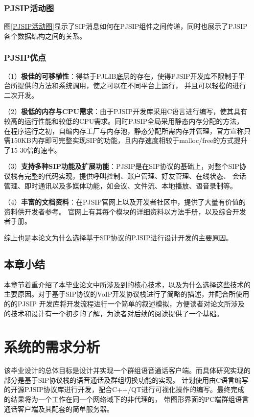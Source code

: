 \documentclass[a4paper,AutoFakeBold,oneside,12pt]{book}
\begin{document}
\subsection{PJSIP活动图}
图\ref{PJSIP活动图}显示了SIP消息如何在PJSIP组件之间传递，同时也展示了PJSIP各个数据结构之间的关系。
\subsection{PJSIP优点}
（1）\textbf{极佳的可移植性}：得益于PJLIB底层的存在，使得PJSIP开发库不限制于平台所提供的方法和系统调用，使之可以在不同平台上运行，
并且可以轻松的进行二次开发。

（2）\textbf{极低的内存与CPU需求}：由于PJSIP开发库采用C语言进行编写，使其具有较高的运行性能和较低的CPU需求。同时PJSIP全局采用静态内存分配的方法，
在程序运行之初，自编内存工厂与内存池，静态分配所需内存并管理，官方宣称只需150KB内存即可完整实现SIP的功能，且内存速度相较于malloc/free的方式提升了15-30倍的速率。

（3）\textbf{支持多种SIP功能及扩展功能}：PJSIP是在SIP协议的基础上，对整个SIP协议栈有完整的代码实现，提供呼叫控制、账户管理、好友管理、在线状态、
会话管理、即时通讯以及多媒体功能，如会议、文件流、本地播放、语音录制等。

（4）\textbf{丰富的文档资料}：在PJSIP官网上以及开发者社区中，提供了大量有价值的资料供开发者参考。
官网上有其每个模块的详细资料以方法手册，以及综合开发者手册。

综上也是本论文为什么选择基于SIP协议的PJSIP进行设计开发的主要原因。
\section{本章小结}
本章节着重介绍了本毕业论文中所涉及到的核心技术，以及为什么选择这些技术的主要原因。对于基于SIP协议的VoIP开发协议栈进行了简略的描述，并配合所使用的的PJSIP
开发库将开发流程进行一个简单的叙述模拟，方便读者对论文所涉及的技术和设计有一个初步的了解，为读者对后续的阅读提供了一个基础。

\newpage
\chapter{系统的需求分析}
该毕业设计的总体目标是设计并实现一个群组语音通话客户端。而具体研究实现的部分是基于SIP协议栈的语音通话及群组切换功能的实现。
计划使用由C语言编写的开源PJSIP协议库进行开发，配合C++/QT进行可视化操作的编写。最终完成的结果将为一个工作在同一个网络域下的非代理的，
带图形界面的PC端群组语言通话客户端及其配套的简单服务器。
\end{document}
